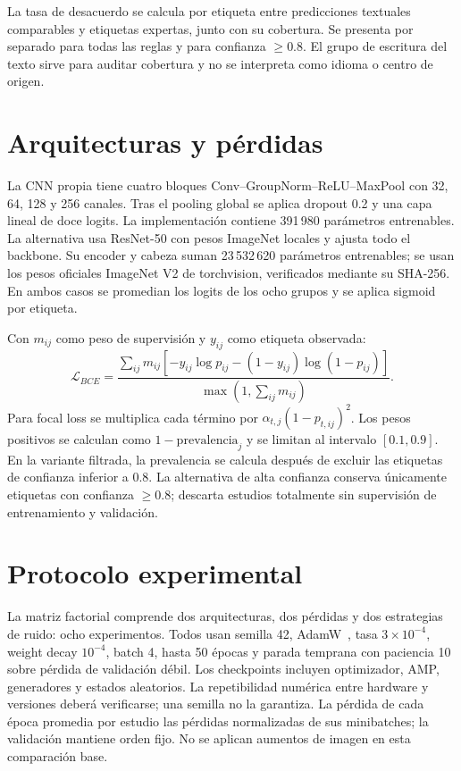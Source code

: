 La tasa de desacuerdo se calcula por etiqueta entre predicciones textuales comparables y etiquetas expertas,
junto con su cobertura. Se presenta por separado para todas las reglas y para confianza $\geq0.8$.
El grupo de escritura del texto sirve para auditar cobertura y no se interpreta como idioma o centro de origen.

\section{Arquitecturas y pérdidas}
La CNN propia tiene cuatro bloques Conv--GroupNorm--ReLU--MaxPool con 32, 64, 128 y 256 canales.
Tras el pooling global se aplica dropout 0.2 y una capa lineal de doce logits.
La implementación contiene 391\,980 parámetros entrenables.
La alternativa usa ResNet-50 con pesos ImageNet locales y ajusta todo el backbone.
Su encoder y cabeza suman 23\,532\,620 parámetros entrenables; se usan los pesos oficiales
ImageNet V2 de torchvision, verificados mediante su SHA-256.
En ambos casos se promedian los logits de los ocho grupos y se aplica sigmoid por etiqueta.

Con $m_{ij}$ como peso de supervisión y $y_{ij}$ como etiqueta observada:
\begin{equation}
\mathcal{L}_{BCE}=
\frac{\sum_{ij}m_{ij}[-y_{ij}\log p_{ij}-(1-y_{ij})\log(1-p_{ij})]}
{\max(1,\sum_{ij}m_{ij})}.
\end{equation}
Para focal loss se multiplica cada término por $\alpha_{t,j}(1-p_{t,ij})^2$.
Los pesos positivos se calculan como $1-\mathrm{prevalencia}_j$ y se limitan al intervalo $[0.1,0.9]$.
En la variante filtrada, la prevalencia se calcula después de excluir las etiquetas de confianza inferior a 0.8.
La alternativa de alta confianza conserva únicamente etiquetas con confianza $\geq0.8$;
descarta estudios totalmente sin supervisión de entrenamiento y validación.

\section{Protocolo experimental}
La matriz factorial comprende dos arquitecturas, dos pérdidas y dos estrategias de ruido: ocho experimentos.
Todos usan semilla 42, AdamW~\cite{adamw}, tasa $3\times10^{-4}$, weight decay $10^{-4}$,
batch 4, hasta 50 épocas y parada temprana con paciencia 10 sobre pérdida de validación débil.
Los checkpoints incluyen optimizador, AMP, generadores y estados aleatorios.
La repetibilidad numérica entre hardware y versiones deberá verificarse; una semilla no la garantiza.
La pérdida de cada época promedia por estudio las pérdidas normalizadas de sus minibatches;
la validación mantiene orden fijo. No se aplican aumentos de imagen en esta comparación base.


